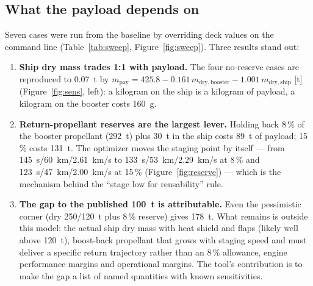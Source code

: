 \documentclass[11pt,a4paper]{article}
\begin{document}
\subsection{What the payload depends on}
Seven cases were run from the baseline by overriding deck values on the command line (Table~\ref{tab:sweep},
Figure~\ref{fig:sweep}). Three results stand out:
\begin{enumerate}
  \item \textbf{Ship dry mass trades 1:1 with payload.} The four no-reserve cases are reproduced to 0.07~t by
        $m_{\mathrm{pay}} = 425.8 - 0.161\,m_{\mathrm{dry,booster}} - 1.001\,m_{\mathrm{dry,ship}}$ [t]
        (Figure~\ref{fig:sens}, left): a kilogram on the ship is a kilogram of payload, a kilogram on the booster costs
        160~g.
  \item \textbf{Return-propellant reserves are the largest lever.} Holding back 8\,\% of the booster propellant (292~t)
        plus 30~t in the ship costs 89~t of payload; 15\,\% costs 131~t. The optimizer moves the staging point by itself
        --- from 145~s/60~km/2.61~km/s to 133~s/53~km/2.29~km/s at 8\,\% and 123~s/47~km/2.00~km/s at 15\,\%
        (Figure~\ref{fig:reserve}) --- which is the mechanism behind the ``stage low for reusability'' rule.
  \item \textbf{The gap to the published 100~t is attributable.} Even the pessimistic corner (dry 250/120~t plus
        8\,\% reserve) gives 178~t. What remains is outside this model: the actual ship dry mass with heat shield and
        flaps (likely well above 120~t), boost-back propellant that grows with staging speed and must deliver a
        specific return trajectory rather than an 8\,\% allowance, engine performance margins and operational
        margins. The tool's contribution is to make the gap a list of named quantities with known sensitivities.
\end{enumerate}
\end{document}
